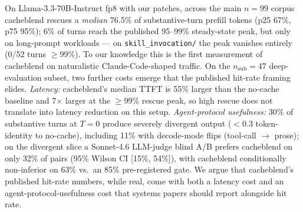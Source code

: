 On Llama-3.3-70B-Instruct fp8 with our patches, across the main
$n{=}99$ corpus cacheblend rescues a \emph{median} 76.5\% of
substantive-turn prefill tokens (p25 67\%, p75 95\%); 6\% of turns
reach the published 95--99\% steady-state peak, but only on
long-prompt workloads --- on \texttt{skill\_invocation/} the peak
vanishes entirely (0/52 turns $\geq$99\%). To our knowledge this is
the first measurement of cacheblend on naturalistic Claude-Code-shaped
traffic.
On the $n_{\text{sub}}{=}47$ deep-evaluation subset, two further
costs emerge that the published hit-rate framing elides.
\emph{Latency:} cacheblend's median TTFT is 55\% larger than the
no-cache baseline and 7$\times$ larger at the $\geq$99\% rescue peak,
so high rescue does not translate into latency reduction on this
setup.
\emph{Agent-protocol usefulness:} 30\% of substantive turns at $T{=}0$
produce severely divergent output ($<$0.3 token-identity to no-cache),
including 11\% with decode-mode flips (tool-call $\to$ prose); on the
divergent slice a Sonnet-4.6 LLM-judge blind A/B prefers cacheblend on
only 32\% of pairs (95\% Wilson CI [15\%, 54\%]), with cacheblend
conditionally non-inferior on 63\% vs.\ an 85\% pre-registered gate.
We argue that cacheblend's published hit-rate numbers, while real,
come with both a latency cost and an agent-protocol-usefulness cost
that systems papers should report alongside hit rate.

